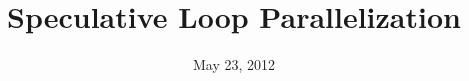 \documentclass[a4paper, 11pt, oneside]{Thesis}  %
\begin{document}
\frontmatter	  %

\title  {Speculative Loop Parallelization}
\newcommand*{\TITLE}{SPECULATIVE LOOP PARALLELIZATION}
\addresses  {\groupname\\\deptname\\\univname}  %
\date       {May 23, 2012}
\subject    {}
\keywords   {}

\maketitle


\fancyhead{}  %
\rhead{\thepage}  %
\lhead{}  %

\pagestyle{fancy}  %
\end{document}
